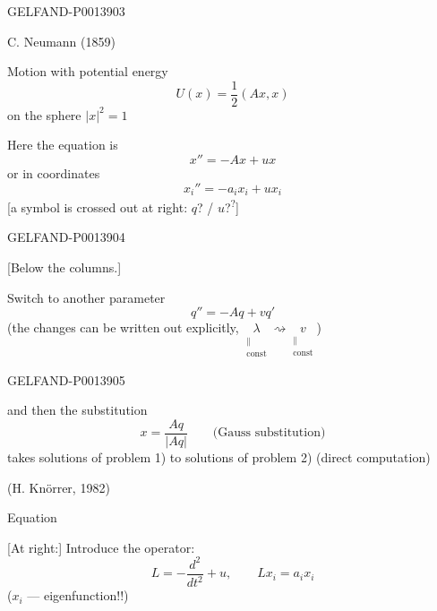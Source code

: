\begin{GelfandAdjacentEvidence}{GELFAND-P001390}{3}

C. Neumann (1859)

Motion with potential energy
\[
U(x)=\frac12(Ax,x)
\]
on the sphere \(\lvert x\rvert^2=1\)

Here the equation is
\begin{equation*}
x''=-Ax+ux
\tag{\(1'\)}
\end{equation*}
or in coordinates
\begin{equation*}
x_i''=-a_i x_i+ux_i
\tag{\(1''\)}
\end{equation*}
[a symbol is crossed out at right:
\(q\)? / \(u\)?\textsuperscript{?}]
\end{GelfandAdjacentEvidence}
\begin{GelfandAdjacentEvidence}{GELFAND-P001390}{4}


[Below the columns.]

Switch to another parameter
\begin{equation*}
q''=-Aq+vq'
\tag{2}
\end{equation*}
(the changes can be written out explicitly,
\(\underset{\substack{\parallel\\\mathrm{const}}}{\lambda}\rightsquigarrow
\underset{\substack{\parallel\\\mathrm{const}}}{v}\))
\end{GelfandAdjacentEvidence}
\begin{GelfandAdjacentEvidence}{GELFAND-P001390}{5}


and then the substitution
\begin{equation*}
x=\frac{Aq}{\lvert Aq\rvert}\qquad\text{(Gauss substitution)}
\tag{3}
\end{equation*}
takes solutions of problem 1) to solutions of problem 2) (direct computation)
\end{GelfandAdjacentEvidence}


(H. Knörrer, 1982)

Equation

[At right:] Introduce the operator:
\begin{equation*}
L=-\frac{d^2}{dt^2}+u,\qquad Lx_i=a_i x_i
\tag{4}
\end{equation*}
(\(x_i\) --- eigenfunction!!)


